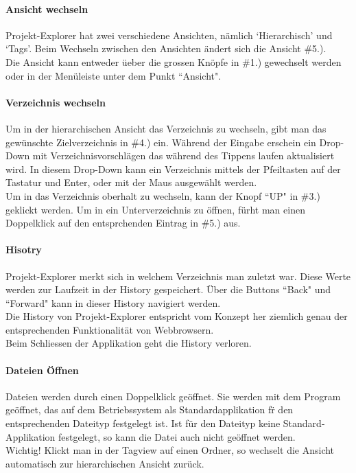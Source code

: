 \documentclass[10pt,paper=a4,final]{scrartcl}
\begin{document}
\paragraph{Ansicht wechseln}
Projekt-Explorer hat zwei verschiedene Ansichten, n\"amlich ‘Hierarchisch’ und ‘Tags’. Beim Wechseln zwischen den Ansichten \"andert sich die Ansicht \#5.).\\
Die Ansicht kann entweder \"ueber die grossen Kn\"opfe in \#1.) gewechselt werden oder in der Men\"uleiste unter dem Punkt “Ansicht".
\paragraph{Verzeichnis wechseln}
Um in der hierarchischen Ansicht das Verzeichnis zu wechseln, gibt man das gew\"unschte Zielverzeichnis in \#4.) ein. W\"ahrend der Eingabe erschein ein Drop-Down mit Verzeichnisvorschl\"agen das w\"ahrend des Tippens laufen aktualisiert wird. In diesem Drop-Down kann ein Verzeichnis mittels der Pfeiltasten auf der Tastatur und Enter, oder mit der Maus ausgew\"ahlt werden.\\
Um in das Verzeichnis oberhalt zu wechseln, kann der Knopf “UP" in \#3.) geklickt werden. Um in ein Unterverzeichnis zu \"offnen, f\"urht man einen Doppelklick auf den entsprchenden Eintrag in \#5.) aus.
\paragraph{Hisotry}
Projekt-Explorer merkt sich in welchem Verzeichnis man zuletzt war. Diese Werte werden zur Laufzeit in der History gespeichert. \"Uber die Buttons “Back" und “Forward" kann in dieser History navigiert werden.\\
Die History von Projekt-Explorer entspricht vom Konzept her ziemlich genau der entsprechenden Funktionalit\"at von Webbrowsern.\\
Beim Schliessen der Applikation geht die History verloren.
\paragraph{Dateien \"Offnen}
Dateien werden durch einen Doppelklick ge\"offnet. Sie werden mit dem Program ge\"offnet, das auf dem Betriebssystem als Standardapplikation f\"r den entsprechenden Dateityp festgelegt ist. Ist f\"ur den Dateityp keine Standard-Applikation festgelegt, so kann die Datei auch nicht ge\"offnet werden.\\
Wichtig! Klickt man in der Tagview auf einen Ordner, so wechselt die Ansicht automatisch zur hierarchischen Ansicht zur\"uck.
\end{document}
